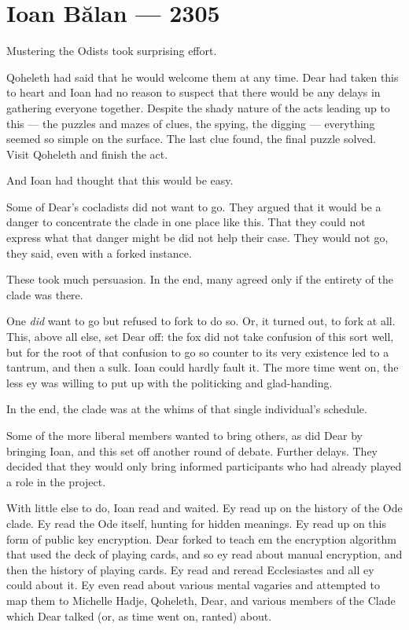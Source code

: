 \hypertarget{ioan-bux103lan-2305}{%
\chapter*{Ioan Bălan — 2305}\label{ioan-bux103lan-2305}}

Mustering the Odists took surprising effort.

Qoheleth had said that he would welcome them at any time. Dear had taken this to heart and Ioan had no reason to suspect that there would be any delays in gathering everyone together. Despite the shady nature of the acts leading up to this — the puzzles and mazes of clues, the spying, the digging — everything seemed so simple on the surface. The last clue found, the final puzzle solved. Visit Qoheleth and finish the act.

And Ioan had thought that this would be easy.

Some of Dear's cocladists did not want to go. They argued that it would be a danger to concentrate the clade in one place like this. That they could not express what that danger might be did not help their case. They would not go, they said, even with a forked instance.

These took much persuasion. In the end, many agreed only if the entirety of the clade was there.

One \emph{did} want to go but refused to fork to do so. Or, it turned out, to fork at all. This, above all else, set Dear off: the fox did not take confusion of this sort well, but for the root of that confusion to go so counter to its very existence led to a tantrum, and then a sulk. Ioan could hardly fault it. The more time went on, the less ey was willing to put up with the politicking and glad-handing.

In the end, the clade was at the whims of that single individual's schedule.

Some of the more liberal members wanted to bring others, as did Dear by bringing Ioan, and this set off another round of debate. Further delays. They decided that they would only bring informed participants who had already played a role in the project.

With little else to do, Ioan read and waited. Ey read up on the history of the Ode clade. Ey read the Ode itself, hunting for hidden meanings. Ey read up on this form of public key encryption. Dear forked to teach em the encryption algorithm that used the deck of playing cards, and so ey read about manual encryption, and then the history of playing cards. Ey read and reread Ecclesiastes and all ey could about it. Ey even read about various mental vagaries and attempted to map them to Michelle Hadje, Qoheleth, Dear, and various members of the Clade which Dear talked (or, as time went on, ranted) about.

